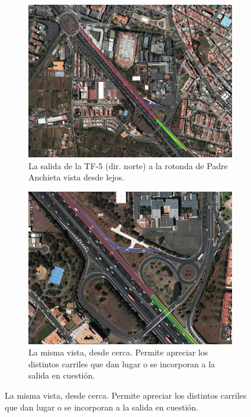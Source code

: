 \begin{figure}[ht]
    \centering
    \begin{subfigure}[t]{0.48\textwidth}
      \centering
      \includegraphics[width=\textwidth]{report/images/salida-tf5-norte-lejos_.png}
      \caption{La salida de la TF-5 (dir. norte) a la rotonda de Padre Anchieta vista desde lejos.}
      \label{fig:salida-tf5-norte-lejos}
    \end{subfigure}
    \hfill
    \begin{subfigure}[t]{0.48\textwidth}
      \centering
      \includegraphics[width=\textwidth]{report/images/salida-tf5-norte-cerca_.png}
      \caption{La misma vista, desde cerca. Permite apreciar los distintos carriles que dan lugar o se incorporan a la salida en cuestión.}

\end{subfigure}
\end{figure}
